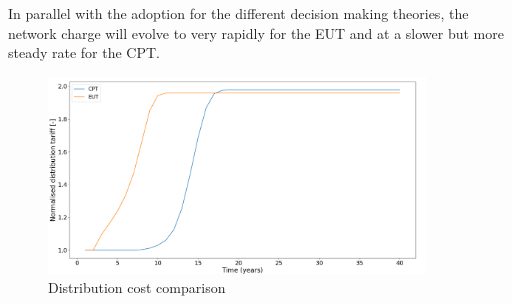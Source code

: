 \noindent
In parallel with the adoption for the different decision making theories, the network charge will evolve to very rapidly for the EUT and at a slower but more steady rate for the CPT.
\begin{figure}[h!]
\centering
\includegraphics[width=10cm]{EUTCompar/Dist.png}
\caption{Distribution cost comparison}
\label{Figure:distcompar}
\end{figure}

